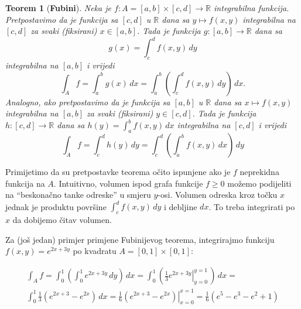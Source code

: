 \documentclass[a4paper, 11pt]{article}
\theoremstyle{plain}
\theoremstyle{plain}
\newtheorem{theorem}[definition]{Teorem}
\theoremstyle{definition}
\theoremstyle{remark}
\begin{document}
    \begin{theorem}[\bf Fubini]
        Neka je $f : A = [a,b] \times [c,d] \to \mathbb{R}$ integrabilna funkcija. Pretpostavimo da je funkcija 
        sa $[c,d]$ u $\mathbb{R}$ dana sa $y \mapsto f(x,y)$ integrabilna na $[c,d]$ 
        za svaki (fiksirani) $x \in [a,b]$.
        Tada je funkcija $g :[a,b] \to \mathbb{R}$ dana sa
        $$
              g(x)=\int_c^d f(x,y)\, dy
        $$
        integrabilna na $[a,b]$ i vrijedi
        \begin{equation}\label{fub1}
            \int_A f=\int_a^b g(x)\, dx
            =\int_a^b \left(\int_c^d f(x,y)\, dy \right)\, dx.        
        \end{equation}
        Analogno, ako pretpostavimo da je funkcija sa $[a,b]$ u $\mathbb{R}$ dana sa $x \mapsto f(x,y)$ 
        integrabilna na $[a,b]$ za svaki (fiksirani) $y \in [c,d]$.
        Tada je funkcija $h :[c,d] \to \mathbb{R}$ dana sa $h(y)=\int_a^b f(x,y)\, dx$ integrabilna na $[c,d]$ i                 vrijedi
        $$
            \int_A f=\int_c^d h(y)\, dy
            =\int_c^d \left(\int_a^b f(x,y)\, dx \right)\, dy
        $$
    \end{theorem}

Primijetimo da su pretpostavke teorema očito ispunjene ako je $f$ neprekidna funkcija na $A$. Intuitivno, volumen ispod grafa funkcije $f \geq 0$ možemo podijeliti na “beskonačno tanke odreske” u smjeru $y$-osi. Volumen odreska kroz točku $x$ jednak je produktu površine $\int_c^d f(x,y)\, dy$ i debljine $dx$. To treba integrirati po $x$ da dobijemo čitav volumen.

Za (još jedan) primjer primjene Fubinijevog teorema, integrirajmo funkciju $f(x,y)= e^{2x+3y}$ po kvadratu $A=[0,1] \times [0,1]$:
\begin{center}
\end{center}

    \begin{multline*}
        \int_A f=
        \int_0^1 \left( \int_0^1 e^{2x+3y}\, dy\right)\, dx= 
        \int_0^1 \left( \left.\frac{1}{3}e^{2x+3y}\right\rvert^{y=1}_{y=0}\, \right)\, dx=\\
        \int_0^1 \frac{1}{3} \left( e^{2x+3}- e^{2x} \right)\, dx= 
        \frac{1}{6}\left.( e^{2x+3}- e^{2x})\right\rvert^{x=1}_{x=0} =
        \frac{1}{6}(e^5-e^3-e^2+1)
    \end{multline*}\newline
\end{document}
